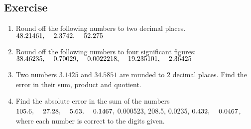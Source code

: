 \documentclass[aima203_lecturenotes_ku.tex]{subfiles}
\begin{document}
\subsection{Exercise}
\begin{enumerate}
\item Round off the following numbers to two decimal places. \\
  \(48.21461, \hspace{4mm} 2.3742, \hspace{4mm} 52.275 \)

\item  Round off the following numbers to four significant figures: \\
  \(38.46235, \hspace{4mm} 0.70029, \hspace{4mm} 0.0022218, \hspace{4mm} 19.235101, \hspace{4mm} 2.36425\)

\item Two numbers \(3.1425\) and \(34.5851\) are rounded to 2 decimal places. Find the error in their sum, product and quotient.

\item Find the absolute error in the sum of the numbers \(105.6, \hspace{4mm} 27.28, \hspace{4mm} 5.63, \hspace{4mm} 0.1467, \)  \hspace{4mm} 0.000523, \hspace{4mm} 208.5, \hspace{4mm} 0.0235, \hspace{4mm} \(0.432, \hspace{4mm} 0.0467\), where each number is correct to the digits given.

\end{enumerate}
\end{document}
